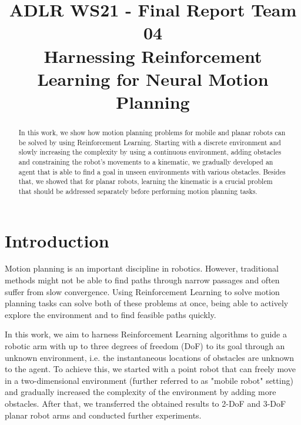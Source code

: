 \documentclass[conference]{IEEEtran}
\begin{document}
\title{ADLR WS21 - Final Report Team 04 \\ Harnessing Reinforcement Learning for Neural Motion Planning\\
}

\author{
\and
{}
}

\maketitle

\begin{abstract}
	In this work, we show how motion planning problems for mobile and planar robots can be solved by using Reinforcement Learning. Starting with a discrete environment and slowly increasing the complexity by using a continuous environment, adding obstacles and constraining the robot's movements to a kinematic, we gradually developed an agent that is able to find a goal in unseen environments with various obstacles. Besides that, we showed that for planar robots, learning the kinematic is a crucial problem that should be addressed separately before performing motion planning tasks.
\end{abstract}

\section{Introduction}
Motion planning is an important discipline in robotics. However, traditional methods might not be able to find paths through narrow passages and often suffer from slow convergence. Using Reinforcement Learning to solve motion planning tasks can solve both of these problems at once, being able to actively explore the environment and to find feasible paths quickly.

 In this work, we aim to harness Reinforcement Learning algorithms to guide a robotic arm with up to three degrees of freedom (DoF) to its goal through an unknown environment, i.e. the instantaneous locations of obstacles are unknown to the agent. To achieve this, we started with a point robot that can freely move in a two-dimensional environment (further referred to as "mobile robot" setting) and gradually increased the complexity of the environment by adding more obstacles. After that, we transferred the obtained results to 2-DoF and 3-DoF planar robot arms and conducted further experiments.
\end{document}
